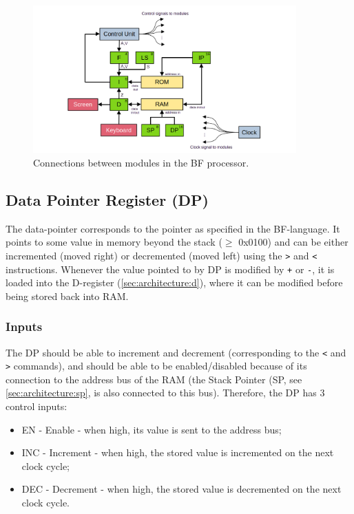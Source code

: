 \begin{figure}[H]
  \centering
  \includegraphics[width=0.9\textwidth]{img/bfcpu_architecture}
  \caption{Connections between modules in the BF processor.}
  \label{fig:architecture}
\end{figure}


\subsection{Data Pointer Register (DP)} \label{sec:architecture:dp}
The data-pointer corresponds to the pointer as specified in the BF-language. It points to some value in memory beyond the stack ($\ge$ 0x0100) and can be either incremented (moved right) or decremented (moved left) using the \texttt{>} and \texttt{<} instructions. Whenever the value pointed to by DP is modified by \texttt{+} or \texttt{-}, it is loaded into the D-register (\ref{sec:architecture:d}), where it can be modified before being stored back into RAM.

\subsubsection*{Inputs}
The DP should be able to increment and decrement (corresponding to the \texttt{<} and \texttt{>} commands), and should be able to be enabled/disabled because of its connection to the address bus of the RAM (the Stack Pointer (SP, see \ref{sec:architecture:sp}, is also connected to this bus). Therefore, the DP has 3 control inputs:
\begin{itemize}
\item EN - Enable - when high, its value is sent to the address bus;
\item INC - Increment - when high, the stored value is incremented on the next clock cycle;
\item DEC - Decrement - when high, the stored value is decremented on the next clock cycle.
\end{itemize}

